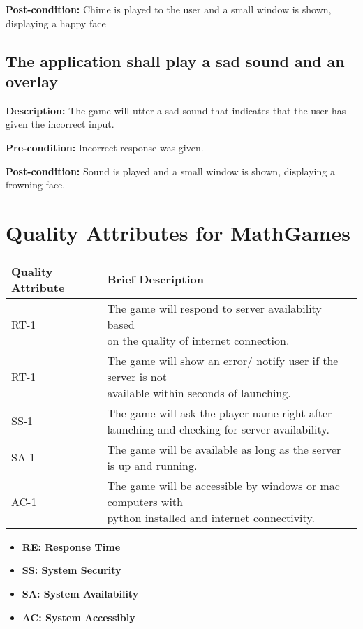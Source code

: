 \documentclass[12pt]{article}
\begin{document}
\begin{flushleft}
\textbf{Post-condition:} Chime is played to the user and a small window is shown, displaying a happy face


\subsection{The application shall play a sad sound and an overlay}

\textbf{Description:} The game will utter a sad sound that indicates that the user has given the incorrect input.

\textbf{Pre-condition:} Incorrect response was given.

\textbf{Post-condition:} Sound is played and a small window is shown, displaying a frowning face.

\end{flushleft}

\newpage

\section{Quality Attributes for MathGames}

\begin{table}[H]
\begin{tabular}{@{}|l|l|@{}}
\toprule
\textbf{Quality Attribute} & \textbf{Brief Description} \\ \midrule
RT-1 & \makecell{The game will respond to server availability based \\ on the quality of internet connection.} \\ \midrule
RT-1 & \makecell{The game will show an error/ notify user if the server is not \\ available within seconds of launching.} \\ \midrule
SS-1 & \makecell{The game will ask the player name right after \\ launching and checking for server availability.} \\ \midrule
SA-1 & The game will be available as long as the server is up and running. \\ \midrule
AC-1 & \makecell{The game will be accessible by windows or mac computers with \\ python installed and internet connectivity}. \\ \bottomrule
\end{tabular}
\end{table}

\begin{itemize}

\item \textbf{RE: Response Time}
\item \textbf{SS: System Security}
\item \textbf{SA: System Availability}
\item \textbf{AC: System Accessibly}

\end{itemize}
\end{document}

